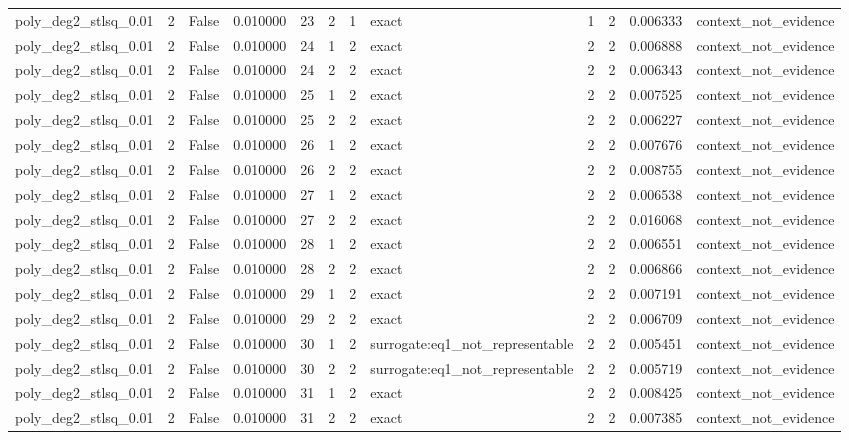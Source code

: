 \begin{tabular}{lrrrrrrlrrrl}
poly\_deg2\_stlsq\_0.01 & 2 & False & 0.010000 & 23 & 2 & 1 & exact & 1 & 2 & 0.006333 & context\_not\_evidence \\
poly\_deg2\_stlsq\_0.01 & 2 & False & 0.010000 & 24 & 1 & 2 & exact & 2 & 2 & 0.006888 & context\_not\_evidence \\
poly\_deg2\_stlsq\_0.01 & 2 & False & 0.010000 & 24 & 2 & 2 & exact & 2 & 2 & 0.006343 & context\_not\_evidence \\
poly\_deg2\_stlsq\_0.01 & 2 & False & 0.010000 & 25 & 1 & 2 & exact & 2 & 2 & 0.007525 & context\_not\_evidence \\
poly\_deg2\_stlsq\_0.01 & 2 & False & 0.010000 & 25 & 2 & 2 & exact & 2 & 2 & 0.006227 & context\_not\_evidence \\
poly\_deg2\_stlsq\_0.01 & 2 & False & 0.010000 & 26 & 1 & 2 & exact & 2 & 2 & 0.007676 & context\_not\_evidence \\
poly\_deg2\_stlsq\_0.01 & 2 & False & 0.010000 & 26 & 2 & 2 & exact & 2 & 2 & 0.008755 & context\_not\_evidence \\
poly\_deg2\_stlsq\_0.01 & 2 & False & 0.010000 & 27 & 1 & 2 & exact & 2 & 2 & 0.006538 & context\_not\_evidence \\
poly\_deg2\_stlsq\_0.01 & 2 & False & 0.010000 & 27 & 2 & 2 & exact & 2 & 2 & 0.016068 & context\_not\_evidence \\
poly\_deg2\_stlsq\_0.01 & 2 & False & 0.010000 & 28 & 1 & 2 & exact & 2 & 2 & 0.006551 & context\_not\_evidence \\
poly\_deg2\_stlsq\_0.01 & 2 & False & 0.010000 & 28 & 2 & 2 & exact & 2 & 2 & 0.006866 & context\_not\_evidence \\
poly\_deg2\_stlsq\_0.01 & 2 & False & 0.010000 & 29 & 1 & 2 & exact & 2 & 2 & 0.007191 & context\_not\_evidence \\
poly\_deg2\_stlsq\_0.01 & 2 & False & 0.010000 & 29 & 2 & 2 & exact & 2 & 2 & 0.006709 & context\_not\_evidence \\
poly\_deg2\_stlsq\_0.01 & 2 & False & 0.010000 & 30 & 1 & 2 & surrogate:eq1\_not\_representable & 2 & 2 & 0.005451 & context\_not\_evidence \\
poly\_deg2\_stlsq\_0.01 & 2 & False & 0.010000 & 30 & 2 & 2 & surrogate:eq1\_not\_representable & 2 & 2 & 0.005719 & context\_not\_evidence \\
poly\_deg2\_stlsq\_0.01 & 2 & False & 0.010000 & 31 & 1 & 2 & exact & 2 & 2 & 0.008425 & context\_not\_evidence \\
poly\_deg2\_stlsq\_0.01 & 2 & False & 0.010000 & 31 & 2 & 2 & exact & 2 & 2 & 0.007385 & context\_not\_evidence \\

\end{tabular}

